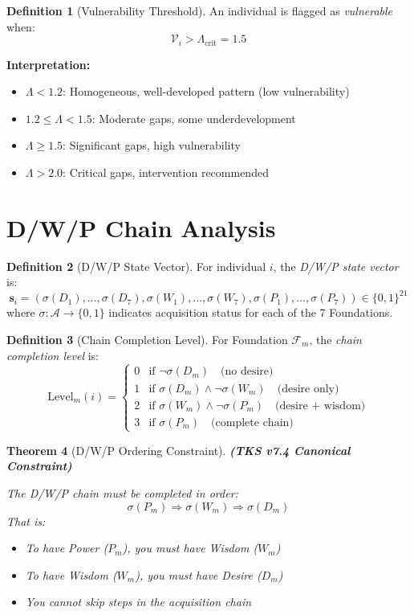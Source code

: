 \documentclass[11pt,twoside]{book}
\theoremstyle{definition}
\newtheorem{definition}{Definition}[chapter]
\theoremstyle{plain}
\newtheorem{theorem}[definition]{Theorem}
\theoremstyle{remark}
\newcommand{\Foundations}{\mathcal{F}}
\newcommand{\Acquisitions}{\mathcal{A}}
\newcommand{\Lacunarity}{\Lambda}
\newcommand{\VulnScore}{\mathcal{V}}
\begin{document}
\begin{definition}[Vulnerability Threshold]
\label{def:vuln-threshold-psych}
An individual is flagged as \emph{vulnerable} when:
\[
    \VulnScore_i > \Lacunarity_{\mathrm{crit}} = 1.5
\]

\textbf{Interpretation:}
\begin{itemize}
    \item $\Lacunarity < 1.2$: Homogeneous, well-developed pattern (low vulnerability)
    \item $1.2 \leq \Lacunarity < 1.5$: Moderate gaps, some underdevelopment
    \item $\Lacunarity \geq 1.5$: Significant gaps, high vulnerability
    \item $\Lacunarity > 2.0$: Critical gaps, intervention recommended
\end{itemize}
\end{definition}

\section{D/W/P Chain Analysis}

\begin{definition}[D/W/P State Vector]
\label{def:dwp-state-psych}
For individual $i$, the \emph{D/W/P state vector} is:
\[
    \mathbf{s}_i = \left( \sigma(D_1), \ldots, \sigma(D_7), \sigma(W_1), \ldots, \sigma(W_7), \sigma(P_1), \ldots, \sigma(P_7) \right) \in \{0, 1\}^{21}
\]
where $\sigma : \Acquisitions \to \{0, 1\}$ indicates acquisition status for each of the 7 Foundations.
\end{definition}

\begin{definition}[Chain Completion Level]
\label{def:chain-level-psych}
For Foundation $\Foundations_m$, the \emph{chain completion level} is:
\[
    \mathrm{Level}_m(i) =
    \begin{cases}
        0 & \text{if } \neg\sigma(D_m) \quad \text{(no desire)} \\
        1 & \text{if } \sigma(D_m) \land \neg\sigma(W_m) \quad \text{(desire only)} \\
        2 & \text{if } \sigma(W_m) \land \neg\sigma(P_m) \quad \text{(desire + wisdom)} \\
        3 & \text{if } \sigma(P_m) \quad \text{(complete chain)}
    \end{cases}
\]
\end{definition}

\begin{theorem}[D/W/P Ordering Constraint]
\label{thm:dwp-ordering}
\textbf{(TKS v7.4 Canonical Constraint)}

The D/W/P chain must be completed in order:
\[
    \sigma(P_m) \Rightarrow \sigma(W_m) \Rightarrow \sigma(D_m)
\]
That is:
\begin{itemize}
    \item To have Power ($P_m$), you must have Wisdom ($W_m$)
    \item To have Wisdom ($W_m$), you must have Desire ($D_m$)
    \item You cannot skip steps in the acquisition chain
\end{itemize}
\end{theorem}
\end{document}

